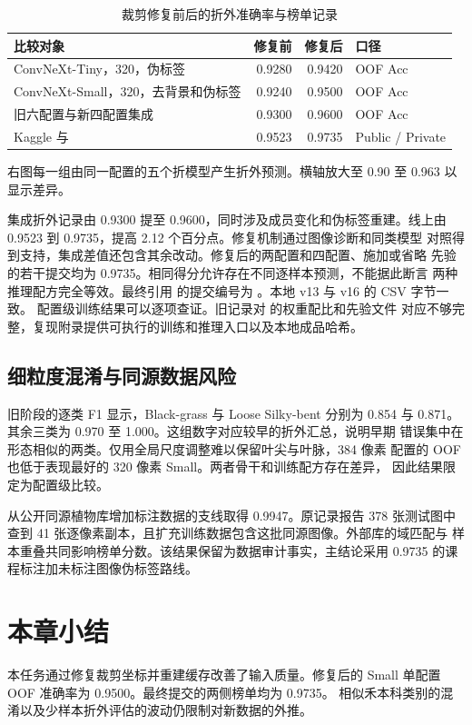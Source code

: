 \begin{table}[H]
\centering\small
\caption{裁剪修复前后的折外准确率与榜单记录}\label{tab:plant-pairs}
\begin{tabularx}{\linewidth}{@{}Yrrl@{}}
\toprule
比较对象 & 修复前 & 修复后 & 口径 \\
\midrule
ConvNeXt-Tiny，320，伪标签 & 0.9280 & 0.9420 & OOF Acc \\
ConvNeXt-Small，320，去背景和伪标签 & 0.9240 & 0.9500 & OOF Acc \\
旧六配置与新四配置集成 & 0.9300 & 0.9600 & OOF Acc \\
Kaggle  与  & 0.9523 & 0.9735 & Public / Private \\
\bottomrule
\end{tabularx}
\end{table}
{右图每一组由同一配置的五个折模型产生折外预测。横轴放大至 0.90 至 0.963 以显示差异。}

集成折外记录由 0.9300 提至 0.9600，同时涉及成员变化和伪标签重建。线上由
0.9523 到 0.9735，提高 2.12 个百分点。修复机制通过图像诊断和同类模型
对照得到支持，集成差值还包含其余改动。修复后的两配置和四配置、施加或省略
先验的若干提交均为 0.9735。相同得分允许存在不同逐样本预测，不能据此断言
两种推理配方完全等效。最终引用  的提交编号为 。本地 v13 与 v16 的 CSV 字节一致。
配置级训练结果可以逐项查证。旧记录对  的权重配比和先验文件
对应不够完整，复现附录提供可执行的训练和推理入口以及本地成品哈希。

\subsection{细粒度混淆与同源数据风险}
旧阶段的逐类 F1 显示，Black-grass 与 Loose Silky-bent 分别为 0.854 与
0.871。其余三类为 0.970 至 1.000。这组数字对应较早的折外汇总，说明早期
错误集中在形态相似的两类。仅用全局尺度调整难以保留叶尖与叶脉，384 像素
配置的 OOF 也低于表现最好的 320 像素 Small。两者骨干和训练配方存在差异，
因此结果限定为配置级比较。

从公开同源植物库增加标注数据的支线取得 0.9947。原记录报告 378 张测试图中
查到 41 张逐像素副本，且扩充训练数据包含这批同源图像。外部库的域匹配与
样本重叠共同影响榜单分数。该结果保留为数据审计事实，主结论采用
0.9735 的课程标注加未标注图像伪标签路线。

\section{本章小结}
本任务通过修复裁剪坐标并重建缓存改善了输入质量。修复后的 Small 单配置 OOF 准确率为 0.9500。最终提交的两侧榜单均为 0.9735。
相似禾本科类别的混淆以及少样本折外评估的波动仍限制对新数据的外推。
